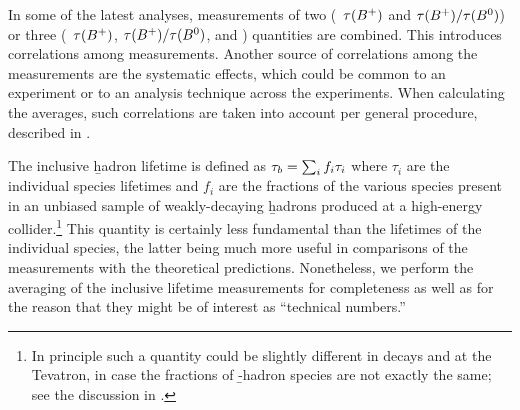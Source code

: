 In some of the latest analyses, measurements of two (\eg\ $\tau(B^+)$ and
$\tau(B^+)/\tau(B^0)$) or three (\eg\ $\tau(B^+)$,
$\tau(B^+)/\tau(B^0)$, and \dmd) quantities are combined.  This
introduces correlations among measurements.  Another source of
correlations among the measurements are the systematic effects, which
could be common to an experiment or to an analysis technique across the
experiments.  When calculating the averages, such correlations are taken
into account per general procedure, described in
.



The inclusive \b hadron lifetime is defined as $\tau_{b} = \sum_i f_i
\tau_i$ where $\tau_i$ are the individual species lifetimes and $f_i$ are
the fractions of the various species present in an unbiased sample of
weakly-decaying \b hadrons produced at a high-energy
collider.\footnote{In principle such a quantity could be slightly
different in  decays and at the Tevatron, in case the
fractions of \b-hadron species are not exactly the same; see the
discussion in .}  This quantity is certainly
less fundamental than the lifetimes of the individual species, the
latter being much more useful in comparisons of the measurements with
the theoretical predictions.  Nonetheless, we perform the averaging of
the inclusive lifetime measurements for completeness as well as for the
reason that they might be of interest as ``technical numbers.''


